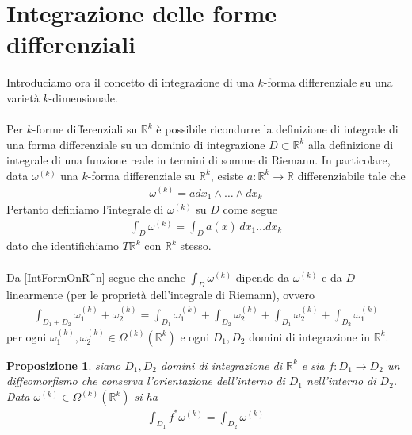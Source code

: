 \documentclass[oneside, 11pt]{amsbook}
\newcommand{\0}{{(0)}}
\newcommand{\3}{{(3)}}
\theoremstyle{colonplain}
\newtheorem{prop}[thm]{Proposizione}
\theoremstyle{colondefinition}
\theoremstyle{colonremark}
\numberwithin{equation}{chapter}
\begin{document}
\section{Integrazione delle forme differenziali}
Introduciamo ora il concetto di integrazione di una $k$-forma differenziale su una varietà $k$-dimensionale. \\ \\
Per $k$-forme differenziali su $\mathbb{R}^k$ è possibile ricondurre la definizione di integrale di una forma differenziale su un dominio di integrazione $D \subset \mathbb{R}^k$ alla definizione di integrale di una funzione reale in termini di somme di Riemann. In particolare, data $\omega^{(k)}$ una $k$-forma differenziale su $\mathbb{R}^k$, esiste $a : \mathbb{R}^k \longrightarrow \mathbb{R}$ differenziabile tale che 
\begin{align}
    \omega^{(k)} = adx_1 \wedge \dots \wedge dx_k 
\end{align}
Pertanto definiamo l'integrale di $\omega^{(k)}$ su $D$ come segue
\begin{align}\label{IntFormOnR^n}
    \int_D \omega^{(k)} = \int_D a(x) \, dx_1 \dots dx_k 
\end{align}
dato che identifichiamo $T\mathbb{R}^k$ con $\mathbb{R}^k$ stesso. \\ \\
Da \eqref{IntFormOnR^n} segue che anche $\int_D \omega^{(k)}$ dipende da $\omega^{(k)}$ e da $D$ linearmente (per le proprietà dell'integrale di Riemann), ovvero
\begin{align}
    \int_{D_1 + D_2} \omega^{(k)}_1 + \omega^{(k)}_2 = \int_{D_1}\omega^{(k)}_1 + \int_{D_2}\omega^{(k)}_2 + \int_{D_1}\omega^{(k)}_2 + \int_{D_2}\omega^{(k)}_1 
\end{align}
per ogni $\omega^{(k)}_1, \omega^{(k)}_2 \in \Omega^{(k)}(\mathbb{R}^k)$ e ogni $D_1, D_2$ domini di integrazione in $\mathbb{R}^k$.
\begin{prop} siano $D_1, D_2$ domini di integrazione di $\mathbb{R}^k$ e sia $f : D_1 \longrightarrow D_2$ un diffeomorfismo che conserva l'orientazione dell'interno di $D_1$ nell'interno di $D_2$. Data $\omega^{(k)} \in \Omega^{(k)}(\mathbb{R}^k)$ si ha
\begin{align}
    \int_{D_1} f^*\omega^{(k)} = \int_{D_2} \omega^{(k) }
\end{align}
\end{prop}
\end{document}
